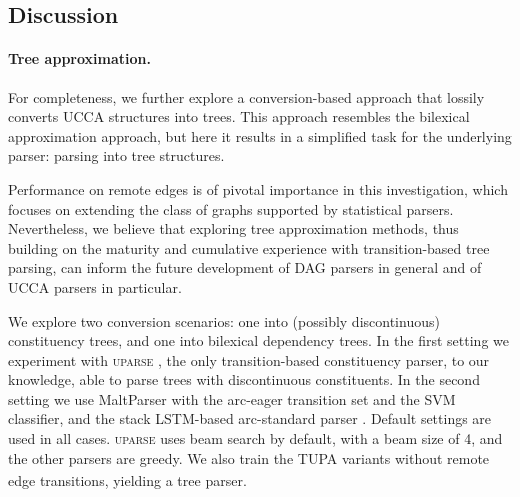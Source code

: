 \documentclass[a0,portrait]{a0poster}
\newcommand{\parser}[1]{TUPA\textsubscript{#1}}
\begin{document}
\begin{multicols}{2}
\section*{Discussion}

\paragraph{Tree approximation.}
For completeness, we further explore a conversion-based approach that
lossily converts UCCA structures into trees. 
This approach resembles the bilexical approximation approach, but here it results in a simplified task for the underlying parser: parsing into tree structures.

Performance on remote edges is of pivotal importance in this investigation, which focuses on extending the class of graphs supported by statistical parsers. Nevertheless, we believe that exploring tree approximation methods, thus building on the maturity and cumulative experience with transition-based tree parsing, can inform the future development of DAG parsers in general and of UCCA parsers in particular.

We explore two conversion scenarios: one into (possibly discontinuous) constituency trees,
and one into bilexical dependency trees. In the first setting we experiment with \textsc{uparse}
\cite{maier-lichte:2016:DiscoNLP},
the only transition-based constituency parser, to our knowledge, able to parse trees with
discontinuous constituents.
In the second setting we use MaltParser \cite{nivre2007maltparser} with the
arc-eager transition set and the SVM classifier,
and the stack LSTM-based arc-standard parser \cite{dyer2015transition}.
Default settings are used in all cases.
\textsc{uparse} uses beam search by default,
with a beam size of 4, and the other parsers are greedy.
We also train the \parser{} variants without remote edge transitions, yielding a tree parser.


\end{multicols}
\end{document}

